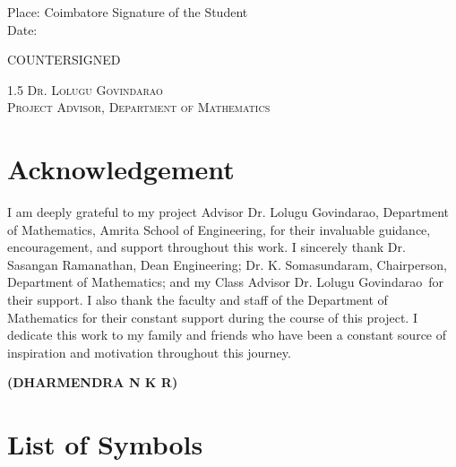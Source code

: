 \documentclass[11pt,a4paper]{report}
\newcommand{\studentName}{DHARMENDRA N K R}
\newcommand{\advisorName}{Dr. Lolugu Govindarao}
\newcommand{\projectAdvisorName}{Dr. Lolugu Govindarao}
\begin{document}
\vspace{2cm}
\noindent Place: Coimbatore \hfill Signature of the Student\\
\noindent Date:

\vspace{1cm}
\begin{center}
\large \textsc{COUNTERSIGNED}\\[0.4cm]
\begin{spacing}{1.5}
\footnotesize \textsc{\projectAdvisorName}\\
\footnotesize \textsc{Project Advisor, Department of Mathematics}
\end{spacing}
\end{center}

\clearpage
{}

\tableofcontents
\clearpage

\chapter*{\centering Acknowledgement}

I am deeply grateful to my project Advisor \projectAdvisorName, Department of Mathematics, Amrita School of Engineering, for their invaluable guidance, encouragement, and support throughout this work. I sincerely thank Dr. Sasangan Ramanathan, Dean Engineering; Dr. K. Somasundaram, Chairperson, Department of Mathematics; and my Class Advisor \advisorName\ for their support. I also thank the faculty and staff of the Department of Mathematics for their constant support during the course of this project. I dedicate this work to my family and friends who have been a constant source of inspiration and motivation throughout this journey.

\hfill \textbf{(\studentName)}
\clearpage

\listoffigures
{}
\clearpage

\listoftables
{}
\clearpage

\chapter*{List of Symbols}
\end{document}
